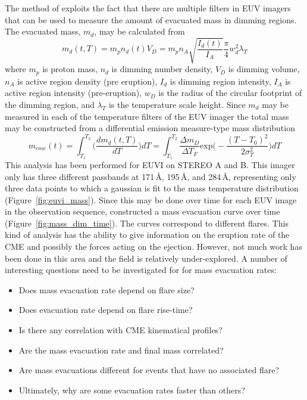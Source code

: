 The method of \citet{aschw09} exploits the fact that there are multiple filters in EUV imagers that can be used to measure the amount of evacuated mass in dimming regions. The evacuated mass, $m_d$, may be calculated from
\begin{equation}
m_d(t,T) = m_p n_d(t)V_D = m_p n_A\sqrt{\frac{I_d(t)}{I_A}}\frac{\pi}{4}w_d^2\lambda_T
\end{equation}
where $m_p$ is proton mass, $n_d$ is dimming number density, $V_D$ is dimming volume, $n_A$ is active region density (pre eruption), $I_d$ is dimming region intensity, $I_A$ is active region intensity (pre-eruption), $w_D$ is the radius of the circular footprint of the dimming region, and $\lambda_T$ is the temperature scale height. Since $m_d$ may be measured in each of the temperature filters of the EUV imager the total mass may be constructed from a differential emission measure-type mass distribution
\begin{equation}
m_{cme}(t)=\int_{T_1}^{T_2}\bigg( \frac{dm_d(t,T)}{dT} \bigg)dT = \int_{T_1}^{T_2}\frac{\Delta m_D}{\Delta T_F}\mathrm{exp}\bigg( -\frac{(T-T_0)^2}{2\sigma_T^2} \bigg)dT
\label{eqn:tot_euv_mass}
\end{equation}
This analysis has been performed for EUVI on STEREO A and B. This imager only has three different passbands at 171\,\AA, 195\,\AA, and 284\,\AA, representing only three data points to which a gaussian is fit to the mass temperature distribution (Figure~\ref{fig:euvi_mass}).
Since this may be done over time for each EUV image in the observation sequence, \citet{aschw09} constructed a mass evacuation curve over time (Figure~\ref{fig:mass_dim_time}). The curves correspond to different flares. This kind of analysis has the ability to give information on the eruption rate of the CME and possibly the forces acting on the ejection. However, not much work has been done in this area and the field is relatively under-explored. A number of interesting questions need to be investigated for for mass evacuation rates:
\begin{itemize}
\item Does mass evacuation rate depend on flare size?
\item Does evacuation rate depend on flare rise-time?
\item Is there any correlation with CME kinematical profiles?
\item Are the mass evacuation rate and final mass correlated?
\item Are mass evacuations different for events that have no associated flare?
\item Ultimately, why are some evacuation rates faster than others?
\end{itemize}
